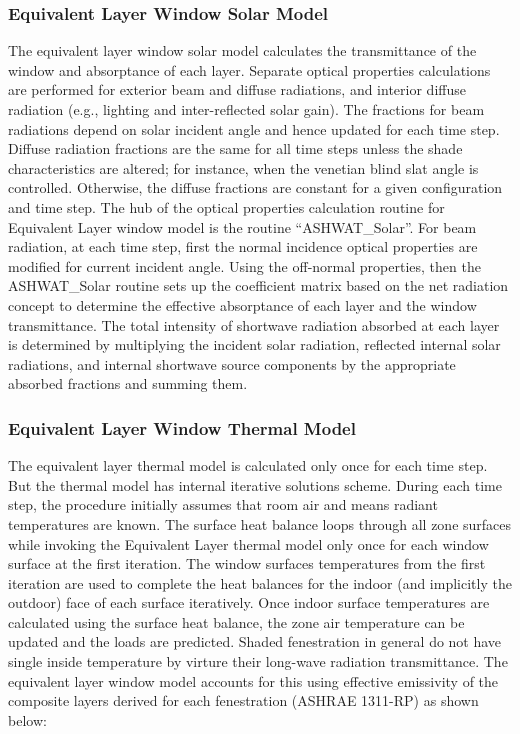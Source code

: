 \subsubsection{Equivalent Layer Window Solar Model}\label{equivalent-layer-window-solar-model}

The equivalent layer window solar model calculates the transmittance of the window and absorptance of each layer. Separate optical properties calculations are performed for exterior beam and diffuse radiations, and interior diffuse radiation (e.g., lighting and inter-reflected solar gain). The fractions for beam radiations depend on solar incident angle and hence updated for each time step. Diffuse radiation fractions are the same for all time steps unless the shade characteristics are altered; for instance, when the venetian blind slat angle is controlled. Otherwise, the diffuse fractions are constant for a given configuration and time step. The hub of the optical properties calculation routine for Equivalent Layer window model is the routine ``ASHWAT\_Solar''. For beam radiation, at each time step, first the normal incidence optical properties are modified for current incident angle. Using the off-normal properties, then the ASHWAT\_Solar routine sets up the coefficient matrix based on the net radiation concept to determine the effective absorptance of each layer and the window transmittance. The total intensity of shortwave radiation absorbed at each layer is determined by multiplying the incident solar radiation, reflected internal solar radiations, and internal shortwave source components by the appropriate absorbed fractions and summing them.

\subsubsection{Equivalent Layer Window Thermal Model}\label{equivalent-layer-window-thermal-model}

The equivalent layer thermal model is calculated only once for each time step. But the thermal model has internal iterative solutions scheme. During each time step, the procedure initially assumes that room air and means radiant temperatures are known. The surface heat balance loops through all zone surfaces while invoking the Equivalent Layer thermal model only once for each window surface at the first iteration. The window surfaces temperatures from the first iteration are used to complete the heat balances for the indoor (and implicitly the outdoor) face of each surface iteratively. Once indoor surface temperatures are calculated using the surface heat balance, the zone air temperature can be updated and the loads are predicted. Shaded fenestration in general do not have single inside temperature by virture their long-wave radiation transmittance. The equivalent layer window model accounts for this using effective emissivity of the composite layers derived for each fenestration (ASHRAE 1311-RP) as shown below:

